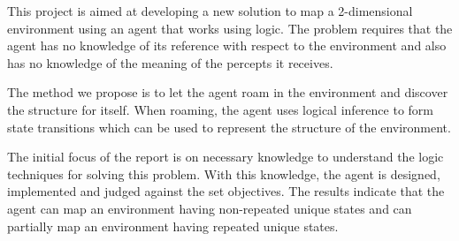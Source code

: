 This project is aimed at developing a new solution to map a 2-dimensional environment using an agent that works using logic. The problem requires that the agent has no knowledge of its reference with respect to the environment and also has no knowledge of the meaning of the percepts it receives.

The method we propose is to let the agent roam in the environment and discover the structure for itself. When roaming, the agent uses logical inference to form state transitions which can be used to represent the structure of the environment.

The initial focus of the report is on necessary knowledge to understand the logic techniques for solving this problem. With this knowledge, the agent is designed, implemented and judged against the set objectives. The results indicate that the agent can map an environment having non-repeated unique states and can partially map an environment having repeated unique states.

































